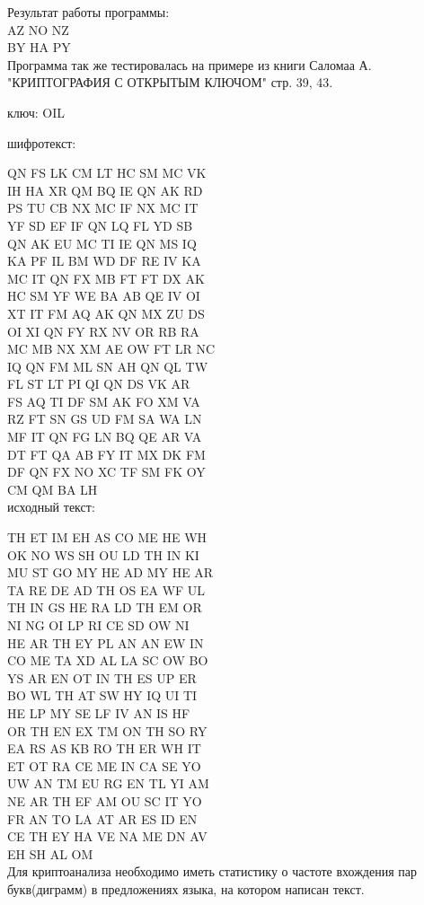 \documentclass[10pt,a4paper]{article}
\begin{document}
Результат работы программы: \\
AZ NO NZ \\
BY HA PY \\

Программа так же тестировалась на примере из книги 
Саломаа А. "КРИПТОГРАФИЯ С ОТКРЫТЫМ КЛЮЧОМ" стр. 39, 43.

ключ: OIL

шифротекст:

QN FS LK CM LT HC SM MC VK \\
IH HA XR QM BQ IE QN AK RD \\
PS TU CB NX MC IF NX MC IT \\
YF SD EF IF QN LQ FL YD SB \\
QN AK EU MC TI IE QN MS IQ \\
KA PF IL BM WD DF RE IV KA \\
MC IT QN FX MB FT FT DX AK \\
HC SM YF WE BA AB QE IV OI \\
XT IT FM AQ AK QN MX ZU DS \\
OI XI QN FY RX NV OR RB RA \\
MC MB NX XM AE OW FT LR NC \\
IQ QN FM ML SN AH QN QL TW \\
FL ST LT PI QI QN DS VK AR \\
FS AQ TI DF SM AK FO XM VA \\
RZ FT SN GS UD FM SA WA LN \\
MF IT QN FG LN BQ QE AR VA \\
DT FT QA AB FY IT MX DK FM \\
DF QN FX NO XC TF SM FK OY \\
CM QM BA LH \\

исходный текст:

TH ET IM EH AS CO ME HE WH \\
OK NO WS SH OU LD TH IN KI \\
MU ST GO MY HE AD MY HE AR \\
TA RE DE AD TH OS EA WF UL \\
TH IN GS HE RA LD TH EM OR \\
NI NG OI LP RI CE SD OW NI \\
HE AR TH EY PL AN AN EW IN \\
CO ME TA XD AL LA SC OW BO \\
YS AR EN OT IN TH ES UP ER \\
BO WL TH AT SW HY IQ UI TI \\
HE LP MY SE LF IV AN IS HF \\
OR TH EN EX TM ON TH SO RY \\
EA RS AS KB RO TH ER WH IT \\
ET OT RA CE ME IN CA SE YO \\
UW AN TM EU RG EN TL YI AM \\
NE AR TH EF AM OU SC IT YO \\
FR AN TO LA AT AR ES ID EN \\
CE TH EY HA VE NA ME DN AV \\
EH SH AL OM \\

Для криптоанализа необходимо иметь статистику о частоте вхождения пар
букв(диграмм) в предложениях языка, на котором написан текст.
\end{document}
